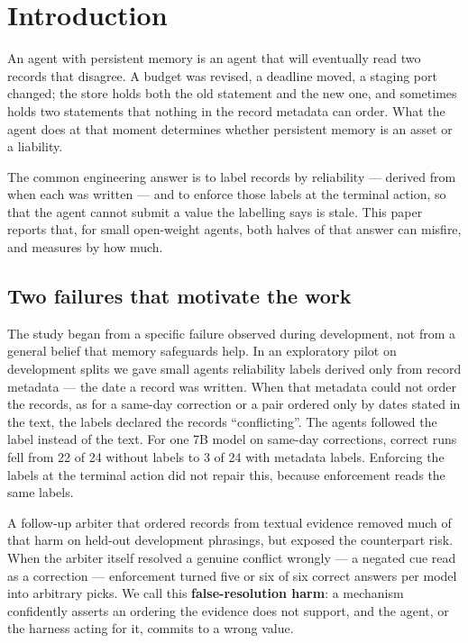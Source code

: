 \section{Introduction}
\label{sec:intro}

An agent with persistent memory is an agent that will eventually read two records that disagree. A budget was
revised, a deadline moved, a staging port changed; the store holds both the old statement and the new one, and
sometimes holds two statements that nothing in the record metadata can order. What the agent does at that moment
determines whether persistent memory is an asset or a liability.

The common engineering answer is to label records by reliability --- derived from when each was written --- and to
enforce those labels at the terminal action, so that the agent cannot submit a value the labelling says is stale.
This paper reports that, for small open-weight agents, both halves of that answer can misfire, and measures by how
much.

\subsection{Two failures that motivate the work}

The study began from a specific failure observed during development, not from a general belief that memory
safeguards help. In an exploratory pilot on development splits we gave small agents reliability labels derived only
from record metadata --- the date a record was written. When that metadata could not order the records, as for a
same-day correction or a pair ordered only by dates stated in the text, the labels declared the records
``conflicting''. The agents followed the label instead of the text. For one 7B model on same-day corrections,
correct runs fell from 22 of 24 without labels to 3 of 24 with metadata labels. Enforcing the labels at the terminal
action did not repair this, because enforcement reads the same labels.

A follow-up arbiter that ordered records from textual evidence removed much of that harm on held-out development
phrasings, but exposed the counterpart risk. When the arbiter itself resolved a genuine conflict wrongly --- a
negated cue read as a correction --- enforcement turned five or six of six correct  answers per model
into arbitrary picks. We call this \textbf{false-resolution harm}: a mechanism confidently asserts an ordering the
evidence does not support, and the agent, or the harness acting for it, commits to a wrong value.

